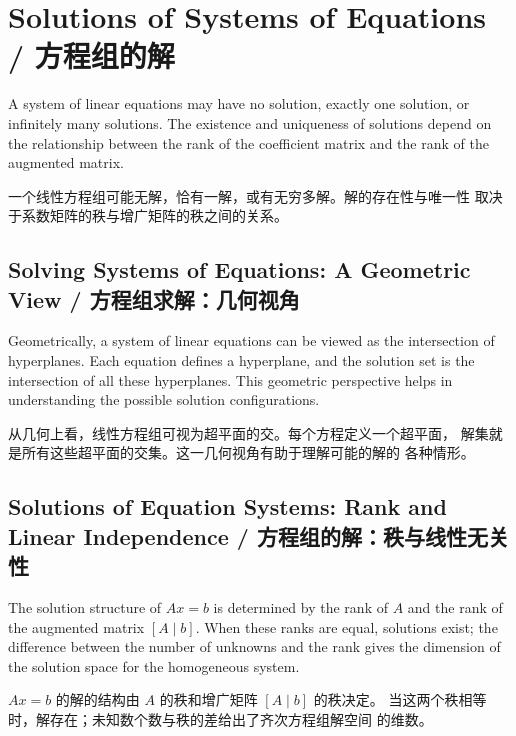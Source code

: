 \section{Solutions of Systems of Equations / 方程组的解}

\begin{original}
A system of linear equations may have no solution, exactly one
solution, or infinitely many solutions.  The existence and uniqueness
of solutions depend on the relationship between the rank of the
coefficient matrix and the rank of the augmented matrix.
\end{original}
\begin{translation}
一个线性方程组可能无解，恰有一解，或有无穷多解。解的存在性与唯一性
取决于系数矩阵的秩与增广矩阵的秩之间的关系。
\end{translation}

\subsection{Solving Systems of Equations: A Geometric View / 方程组求解：几何视角}

\begin{original}
Geometrically, a system of linear equations can be viewed as the
intersection of hyperplanes.  Each equation defines a hyperplane, and
the solution set is the intersection of all these hyperplanes.  This
geometric perspective helps in understanding the possible solution
configurations.
\end{original}
\begin{translation}
从几何上看，线性方程组可视为超平面的交。每个方程定义一个超平面，
解集就是所有这些超平面的交集。这一几何视角有助于理解可能的解的
各种情形。
\end{translation}

\subsection{Solutions of Equation Systems: Rank and Linear Independence / 方程组的解：秩与线性无关性}

\begin{original}
The solution structure of $Ax = b$ is determined by the rank of $A$ and
the rank of the augmented matrix $[A \mid b]$.  When these ranks are
equal, solutions exist; the difference between the number of unknowns
and the rank gives the dimension of the solution space for the
homogeneous system.
\end{original}
\begin{translation}
$Ax = b$ 的解的结构由 $A$ 的秩和增广矩阵 $[A \mid b]$ 的秩决定。
当这两个秩相等时，解存在；未知数个数与秩的差给出了齐次方程组解空间
的维数。
\end{translation}

